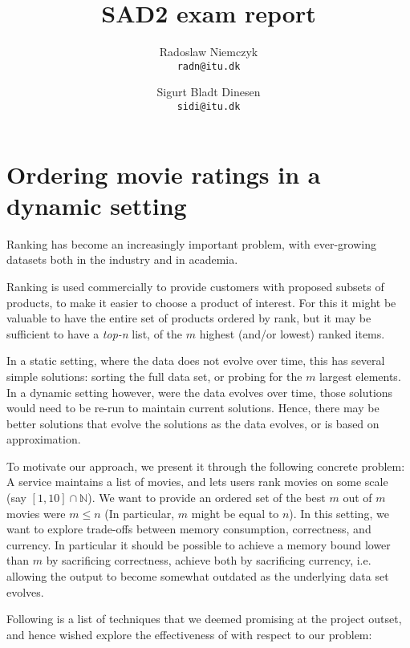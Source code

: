 \documentclass[a4paper, titlepage]{report}
\renewcommand{\%}{\scalebox{.9}{\oldpct}}
\begin{document}
\title{SAD2 exam report}
\author{
	Radoslaw Niemczyk
	\\\texttt{radn@itu.dk}
	\and
	Sigurt Bladt Dinesen
	\\\texttt{sidi@itu.dk}
}

\maketitle


\section*{Ordering movie ratings in a dynamic setting}
Ranking has become an increasingly important problem, with ever-growing datasets
both in the industry and in academia.

Ranking is used commercially to provide customers with proposed subsets of
products, to make it easier to choose a product of interest. For this it might
be valuable to have the entire set of products ordered by rank, but it may be
sufficient to have a \textit{top-n} list, of the $m$ highest (and/or lowest)
ranked items.

In a static setting, where the data does not evolve over time, this has several
simple solutions: sorting the full data set, or probing for the $m$ largest
elements. In a dynamic setting however, were the data evolves over time, those
solutions would need to be re-run to maintain current solutions. Hence, there
may be better solutions that evolve the solutions as the data evolves, or is
based on approximation.

To motivate our approach, we present it through the following concrete problem:
A service maintains a list of movies, and lets users rank movies on some scale
(say $\left[1,10\right]\cap \mathbb{N}$). We want to provide an ordered set of the best $m$ out of
$m$ movies were $m\leq n$ (In particular, $m$ might be equal to $n$).
In this setting, we want to explore trade-offs between memory consumption,
correctness, and  currency. In particular it should be possible to achieve a
memory bound lower than $m$ by sacrificing correctness, achieve both by
sacrificing currency, i.e. allowing the output to become somewhat outdated as
the underlying data set evolves.

Following is a list of techniques that we deemed promising at the project
outset, and hence wished explore the effectiveness of with respect to our
problem:
\end{document}
